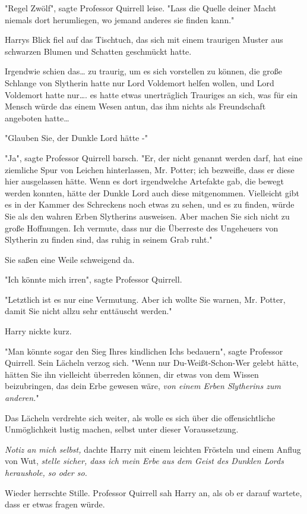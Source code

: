 {"Regel Zwölf", sagte Professor Quirrell leise. "Lass die Quelle deiner Macht niemals dort herumliegen, wo jemand anderes sie finden kann."

Harrys Blick fiel auf das Tischtuch, das sich mit einem traurigen Muster aus schwarzen Blumen und Schatten geschmückt hatte.

Irgendwie schien das… zu traurig, um es sich vorstellen zu können, die große Schlange von Slytherin hatte nur Lord Voldemort helfen wollen, und Lord Voldemort hatte nur…. es hatte etwas unerträglich Trauriges an sich, was für ein Mensch würde das einem Wesen antun, das ihm nichts als Freundschaft angeboten hatte…

"Glauben Sie, der Dunkle Lord hätte -"

"Ja", sagte Professor Quirrell barsch. "Er, der nicht genannt werden darf, hat eine ziemliche Spur von Leichen hinterlassen, Mr. Potter; ich bezweifle, dass er diese hier ausgelassen hätte. Wenn es dort irgendwelche Artefakte gab, die bewegt werden konnten, hätte der Dunkle Lord auch diese mitgenommen. Vielleicht gibt es in der Kammer des Schreckens noch etwas zu sehen, und es zu finden, würde Sie als den wahren Erben Slytherins ausweisen. Aber machen Sie sich nicht zu große Hoffnungen. Ich vermute, dass nur die Überreste des Ungeheuers von Slytherin zu finden sind, das ruhig in seinem Grab ruht."

Sie saßen eine Weile schweigend da.

"Ich könnte mich irren", sagte Professor Quirrell.

"Letztlich ist es nur eine Vermutung. Aber ich wollte Sie warnen, Mr. Potter, damit Sie nicht allzu sehr enttäuscht werden."

Harry nickte kurz.

"Man könnte sogar den Sieg Ihres kindlichen Ichs bedauern", sagte Professor Quirrell. Sein Lächeln verzog sich. "Wenn nur Du-Weißt-Schon-Wer gelebt hätte, hätten Sie ihn vielleicht überreden können, dir etwas von dem Wissen beizubringen, das dein Erbe gewesen wäre, \emph{von einem Erben Slytherins zum anderen.}"

Das Lächeln verdrehte sich weiter, als wolle es sich über die offensichtliche Unmöglichkeit lustig machen, selbst unter dieser Voraussetzung.

\emph{Notiz an mich selbst,} dachte Harry mit einem leichten Frösteln und einem Anflug von Wut, \emph{stelle sicher, dass ich mein Erbe aus dem Geist des Dunklen Lords heraushole, so oder so.}

Wieder herrschte Stille. Professor Quirrell sah Harry an, als ob er darauf wartete, dass er etwas fragen würde.

}
